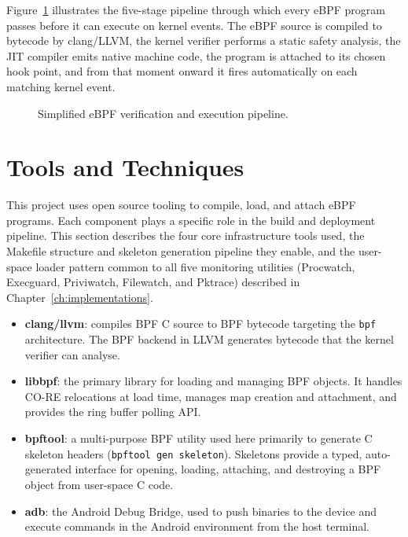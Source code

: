 \documentclass{mnitjaipur}
\begin{document}
Figure~\ref{fig:ebpf-pipeline} illustrates the five-stage pipeline through which every eBPF program passes before it can execute on kernel events. The eBPF source is compiled to bytecode by clang/LLVM, the kernel verifier performs a static safety analysis, the JIT compiler emits native machine code, the program is attached to its chosen hook point, and from that moment onward it fires automatically on each matching kernel event.

\begin{figure}[H]
  \centering
  \caption{Simplified eBPF verification and execution pipeline.}
  \label{fig:ebpf-pipeline}
\end{figure}

\clearpage
\chapter{Tools and Techniques}
This project uses open source tooling to compile, load, and attach eBPF programs. Each component plays a specific role in the build and deployment pipeline. This section describes the four core infrastructure tools used, the Makefile structure and skeleton generation pipeline they enable, and the user-space loader pattern common to all five monitoring utilities (Procwatch, Execguard, Priviwatch, Filewatch, and Pktrace) described in Chapter~\ref{ch:implementations}.

\begin{itemize}
  \item \textbf{clang/llvm}: compiles BPF C source to BPF bytecode targeting the \texttt{bpf} architecture. The BPF backend in LLVM generates bytecode that the kernel verifier can analyse.
  \item \textbf{libbpf}: the primary library for loading and managing BPF objects. It handles CO-RE relocations at load time, manages map creation and attachment, and provides the ring buffer polling API.
  \item \textbf{bpftool}: a multi-purpose BPF utility used here primarily to generate C skeleton headers (\texttt{bpftool gen skeleton}). Skeletons provide a typed, auto-generated interface for opening, loading, attaching, and destroying a BPF object from user-space C code.
  \item \textbf{adb}: the Android Debug Bridge, used to push binaries to the device and execute commands in the Android environment from the host terminal.
\end{itemize}
\end{document}
